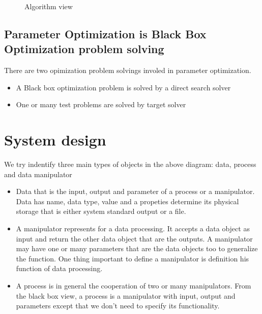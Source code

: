 \documentclass{report}
\begin{document}
\begin{figure}[hpbt]
  \caption{Algorithm view}
  \label{fig:algorithm-view}
\end{figure}

\section{Parameter Optimization is Black Box Optimization problem solving}
\par There are two opimization problem solvings involed in parameter optimization.
\begin{itemize}
\item A Black box optimization problem is solved by a direct search solver
\item One or many test problems are solved by target solver
\end{itemize}
\chapter{System design}
\par We try indentify three main types of objects in the above diagram: data, process and data manipulator
\begin{itemize}
\item Data that is the input, output and parameter of a process or a manipulator. Data has name, data type,
  value and a propeties determine its physical storage that is either system standard output or a file.
\item A manipulator represents for a data processing. It accepts a data object as input and return the other
  data object that are the outputs. A manipulator may have one or many parameters that are the data objects
  too to generalize the function. One thing important to define a manipulator is definition his function of
  data processing.
\item A process is in general the cooperation of two or many manipulators. From the black box view, a process
  is a manipulator with input, output and parameters except that we don't need to specify its functionality.
\end{itemize}
\end{document}
